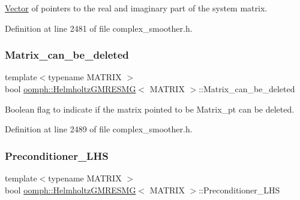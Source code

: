 \hyperlink{classoomph_1_1Vector}{Vector} of pointers to the real and imaginary part of the system matrix. 



Definition at line 2481 of file complex\+\_\+smoother.\+h.

\mbox{\label{classoomph_1_1HelmholtzGMRESMG_a1550b5147f7fa822e8cbc9de93f1c06f}} 
\subsubsection{\texorpdfstring{Matrix\+\_\+can\+\_\+be\+\_\+deleted}{Matrix\_can\_be\_deleted}}
{\footnotesize\ttfamily template$<$typename M\+A\+T\+R\+IX $>$ \\
bool \hyperlink{classoomph_1_1HelmholtzGMRESMG}{oomph\+::\+Helmholtz\+G\+M\+R\+E\+S\+MG}$<$ M\+A\+T\+R\+IX $>$\+::Matrix\+\_\+can\+\_\+be\+\_\+deleted\hspace{0.3cm}{\ttfamily [protected]}}



Boolean flag to indicate if the matrix pointed to be Matrix\+\_\+pt can be deleted. 



Definition at line 2489 of file complex\+\_\+smoother.\+h.

\mbox{\label{classoomph_1_1HelmholtzGMRESMG_a7f151e92397721fc2ae6acdd8253d685}} 
\subsubsection{\texorpdfstring{Preconditioner\+\_\+\+L\+HS}{Preconditioner\_LHS}}
{\footnotesize\ttfamily template$<$typename M\+A\+T\+R\+IX $>$ \\
bool \hyperlink{classoomph_1_1HelmholtzGMRESMG}{oomph\+::\+Helmholtz\+G\+M\+R\+E\+S\+MG}$<$ M\+A\+T\+R\+IX $>$\+::Preconditioner\+\_\+\+L\+HS\hspace{0.3cm}{\ttfamily [protected]}}




